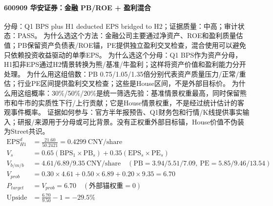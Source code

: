 \paragraph{600909 华安证券：金融 PB/ROE + 盈利混合}
分母：Q1 BPS plus H1 deducted EPS bridged to H2；证据质量：中高；审计状态：PASS。
为什么选这个方法：金融公司主要通过净资产、ROE和盈利质量估值；PB保留资产负债表/ROE锚，PE提供独立盈利交叉检查，混合使用可以避免只依赖投资收益驱动的单季EPS。
为什么选这个分母：Q1 BPS作为资产分母，H1扣非EPS通过H2情景转换为熊/基准/牛盈利；这样将资产价值和盈利能力分开处理。
为什么用这组倍数：PB 0.75/1.05/1.35倍分别代表资产质量压力/正常/重估；行业PE区间提供盈利交叉检查；这些是House区间，不是外部目标价。
为什么用这组概率：30\%/50\%/20\%是统一筛选先验：基准情景权重最高，同时保留熊市和牛市的实质性下行/上行贡献；它是House情景权重，不是经过统计估计的客观事件概率。
证据如何参与：官方半年报预告、Q1财务包和行情/K线提供事实输入；研报/来源用于分母或可比背景。没有正权重外部目标锚，House价值不伪装为Street共识。
\begin{align*}
\mathrm{EPS}_{H1}^d &= \frac{21.60}{50.2421} = 0.4299\ \mathrm{CNY/share}\\
V_s &= 0.65\left(\mathrm{BPS}_1\times \mathrm{PB}_s\right)+0.35\left(\mathrm{EPS}_s\times \mathrm{PE}_s\right)\\
V_{b/m/b} &= 4.61/6.89/9.35\ \mathrm{CNY/share}\quad(\mathrm{PB}=3.94/5.51/7.09,\ \mathrm{PE}=5.85/9.46/13.54)\\
V_{prob} &= 0.30\times 4.61+0.50\times 6.89+0.20\times 9.35=6.70\\
P_{target} &= V_{prob}=6.70\quad(\text{外部锚权重}=0)\\
\mathrm{Upside} &= \frac{6.70}{9.50}-1=-29.5\%\\
\end{align*}

